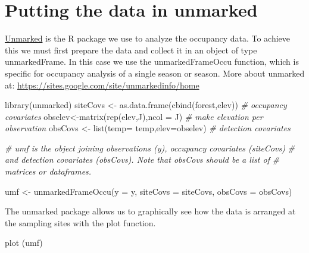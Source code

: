 \documentclass[
]{book}
\newenvironment{Shaded}{\begin{snugshade}}{\end{snugshade}}
\newcommand{\AttributeTok}[1]{\textcolor[rgb]{0.77,0.63,0.00}{#1}}
\newcommand{\CommentTok}[1]{\textcolor[rgb]{0.56,0.35,0.01}{\textit{#1}}}
\newcommand{\FunctionTok}[1]{\textcolor[rgb]{0.00,0.00,0.00}{#1}}
\newcommand{\NormalTok}[1]{#1}
\newcommand{\OtherTok}[1]{\textcolor[rgb]{0.56,0.35,0.01}{#1}}
\begin{document}
\hypertarget{putting-the-data-in-unmarked}{%
\section{Putting the data in unmarked}\label{putting-the-data-in-unmarked}}

\href{http://cran.r-project.org/web/packages/unmarked/index.html}{Unmarked} is the R package we use to analyze the \citep{Fiske2011} occupancy data. To achieve this we must first prepare the data and collect it in an object of type unmarkedFrame. In this case we use the unmarkedFrameOccu function, which is specific for occupancy analysis of a single season or season. More about unmarked at: \url{https://sites.google.com/site/unmarkedinfo/home}

\begin{Shaded}
\begin{Highlighting}[]
\FunctionTok{library}\NormalTok{(unmarked)}
\NormalTok{siteCovs }\OtherTok{\textless{}{-}} \FunctionTok{as.data.frame}\NormalTok{(}\FunctionTok{cbind}\NormalTok{(forest,elev)) }\CommentTok{\# occupancy covariates }
\NormalTok{obselev}\OtherTok{\textless{}{-}}\FunctionTok{matrix}\NormalTok{(}\FunctionTok{rep}\NormalTok{(elev,J),}\AttributeTok{ncol =}\NormalTok{ J) }\CommentTok{\# make elevation per observation}
\NormalTok{obsCovs }\OtherTok{\textless{}{-}} \FunctionTok{list}\NormalTok{(}\AttributeTok{temp=}\NormalTok{ temp,}\AttributeTok{elev=}\NormalTok{obselev) }\CommentTok{\# detection covariates}

\CommentTok{\# umf is the object joining observations (y), occupancy covariates (siteCovs)}
\CommentTok{\# and detection covariates (obsCovs). Note that obsCovs should be a list of }
\CommentTok{\# matrices or dataframes.}

\NormalTok{umf }\OtherTok{\textless{}{-}} \FunctionTok{unmarkedFrameOccu}\NormalTok{(}\AttributeTok{y =}\NormalTok{ y, }\AttributeTok{siteCovs =}\NormalTok{ siteCovs, }\AttributeTok{obsCovs =}\NormalTok{ obsCovs)}
\end{Highlighting}
\end{Shaded}

The unmarked package allows us to graphically see how the data is arranged at the sampling sites with the plot function.

\begin{Shaded}
\begin{Highlighting}[]
\FunctionTok{plot}\NormalTok{ (umf)}
\end{Highlighting}
\end{Shaded}
\end{document}

